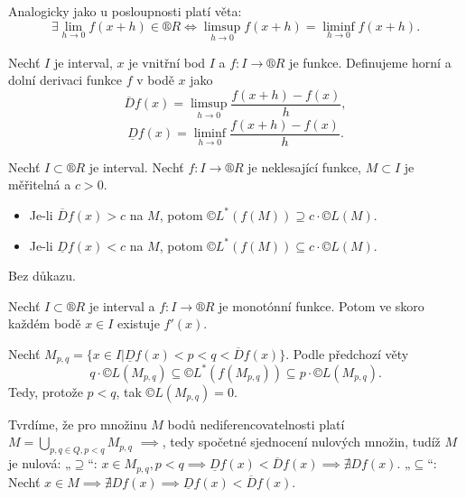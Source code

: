 \documentclass[12pt]{article}					%
\begin{document}
	\begin{poznamka}
		Analogicky jako u posloupnosti platí věta:
		$$ \exists \lim_{h \rightarrow 0} f(x + h) \in ®R \Leftrightarrow \limsup_{h \rightarrow 0} f(x + h) = \liminf_{h \rightarrow 0} f(x + h). $$
	\end{poznamka}

	\begin{definice}
		Nechť $I$ je interval, $x$ je vnitřní bod $I$ a $f: I \rightarrow ®R$ je funkce. Definujeme horní a dolní derivaci funkce $f$ v bodě $x$ jako
		$$ \overline{D} f(x) = \limsup_{h \rightarrow 0} \frac{f(x + h) - f(x)}{h}, $$
		$$ \underline{D} f(x) = \liminf_{h \rightarrow 0} \frac{f(x + h) - f(x)}{h}. $$
	\end{definice}

	\begin{veta}
		Nechť $I \subset ®R$ je interval. Nechť $f: I \rightarrow ®R$ je neklesající funkce, $M \subset I$ je měřitelná a $c > 0$.

		\begin{itemize}
			\item Je-li $\overline{D} f(x) > c$ na $M$, potom $©L^*(f(M)) \supseteq c·©L(M)$.
			\item Je-li $\underline{D} f(x) < c$ na $M$, potom $©L^*(f(M)) \subseteq c·©L(M)$.
		\end{itemize}

		\begin{dukazin}
			Bez důkazu.
		\end{dukazin}
	\end{veta}

	\begin{veta}
		Nechť $I \subset ®R$ je interval a $f: I \rightarrow ®R$ je monotónní funkce. Potom ve skoro každém bodě $x \in I$ existuje $f'(x)$.

		\begin{dukazin}
			Nechť $M_{p, q} = \{x \in I | \underline{D}f(x) < p < q < \overline{D}f(x)\}$. Podle předchozí věty
			$$ q·©L(M_{p, q}) \subseteq ©L^*(f(M_{p, q})) \subseteq p·©L(M_{p, q}). $$
			Tedy, protože $p < q$, tak $©L(M_{p, q}) = 0$.

			Tvrdíme, že pro množinu $M$ bodů nediferencovatelnosti platí $M = \bigcup_{p, q \in Q, p < q} M_{p, q}$ $\implies$, tedy spočetné sjednocení nulových množin, tudíž $M$ je nulová: „$\supseteq$“: $x \in M_{p, q}, p < q \implies \underline{D}f(x) < \overline{D}f(x) \implies \nexists D f(x)$. „$\subseteq$“: Nechť $x \in M \implies \nexists D f(x) \implies \underline{D} f(x) < \overline{D}f(x)$.
		\end{dukazin}
	\end{veta}
\end{document}
